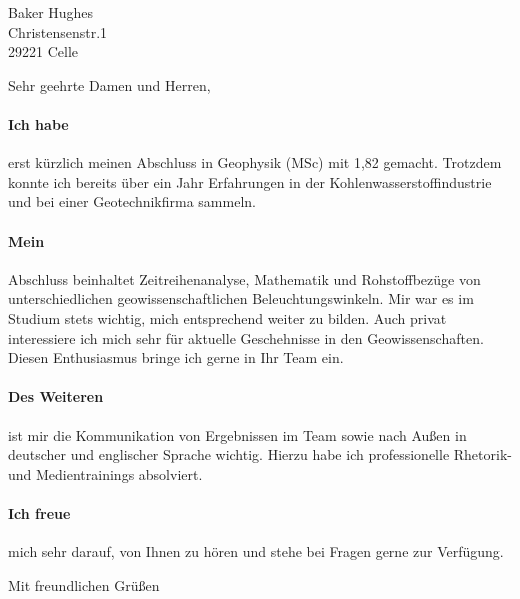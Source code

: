 \documentclass[nocolors,noadress]{friggeri-txt}
\begin{document}

\begin{letter}{ %
Baker Hughes\\
Christensenstr.1\\
29221 Celle}

\opening{Sehr geehrte Damen und Herren,}
\paragraph{Ich habe }{erst k\"urzlich meinen Abschluss in Geophysik (MSc) mit 1,82 gemacht. Trotzdem konnte ich bereits \"uber ein Jahr Erfahrungen in der Kohlenwasserstoffindustrie und bei einer Geotechnikfirma sammeln.}\\[6pt]
\paragraph{Mein }{Abschluss beinhaltet Zeitreihenanalyse, Mathematik und Rohstoffbez\"uge von unterschiedlichen geowissenschaftlichen Beleuchtungswinkeln. Mir war es im Studium stets wichtig, mich entsprechend weiter zu bilden. Auch privat interessiere ich mich sehr für aktuelle Geschehnisse in den Geowissenschaften. Diesen Enthusiasmus bringe ich gerne in Ihr Team ein.}\\[6pt]
\paragraph{Des Weiteren }{ist mir die Kommunikation von Ergebnissen im Team sowie nach Au\ss en in deutscher und englischer Sprache wichtig. Hierzu habe ich professionelle Rhetorik- und Medientrainings absolviert.}\\[6pt]
\paragraph{Ich freue }{mich sehr darauf, von Ihnen zu h\"oren und stehe bei Fragen gerne zur Verf\"ugung.}

Mit freundlichen Grüßen\\
\vspace*{-40pt}
\end{letter}
\end{document}
